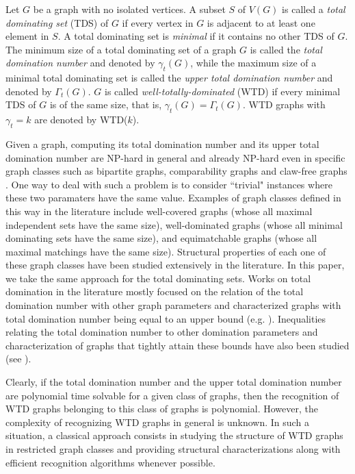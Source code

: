 \documentclass[11pt]{article}
\theoremstyle{definition}
\begin{document}
Let $G$ be a graph with no isolated vertices.
A subset $S$ of $V(G)$ is called a \emph{total dominating set} (TDS) of $G$ if every vertex in $G$ is adjacent to at least one element in $S$.
A total dominating set is \emph{minimal} if it contains no other TDS of $G$. The minimum size of a total dominating set of a graph $G$ is called the \emph{total domination number} and denoted by $\gamma_{t}(G)$, while the maximum size of a minimal total dominating set is called the \emph{upper total domination number} and denoted by $\Gamma_{t}(G)$. $G$ is called \emph{well-totally-dominated} (WTD) if every minimal TDS of $G$ is of the same size, that is, $\gamma_t(G)=\Gamma_t(G)$.
WTD graphs with $\gamma_t=k$ are denoted by WTD($k$).

Given a graph, computing its total domination number and its upper total domination number are NP-hard in general \cite{pfaff:1984, fang:2004} and already NP-hard even in specific graph classes such as bipartite graphs, comparability graphs and claw-free graphs \cite{HeYe13}. One way to deal with such a problem is to consider ``trivial" instances where these two paramaters have the same value. Examples of graph classes defined in this way in the literature include well-covered graphs (whose all maximal independent sets have the same size), well-dominated graphs (whose all minimal dominating sets have the same size), and equimatchable graphs (whose all maximal matchings have the same size). Structural properties of each one of these graph classes have been studied extensively in the literature.  In this paper, we take the same approach for the total dominating sets. Works on total domination in the literature mostly focused on the relation of the total domination number with other graph parameters and characterized graphs with total domination number being equal to an upper bound (e.g. \cite{CDH80, BCV20}). 
Inequalities relating the total domination number to other domination parameters and characterization of graphs that tightly attain these bounds have also been studied (see \cite{HLX10, BaGo18}).




Clearly, if the total domination number and the upper total domination number are polynomial time solvable for a given class of graphs, then the recognition of WTD graphs belonging to this class of graphs is polynomial. However, the complexity of recognizing WTD graphs in general is unknown. In such a situation, a classical approach consists in studying the structure of WTD graphs in restricted graph classes and providing structural characterizations along with efficient recognition algorithms whenever possible.
\end{document}

